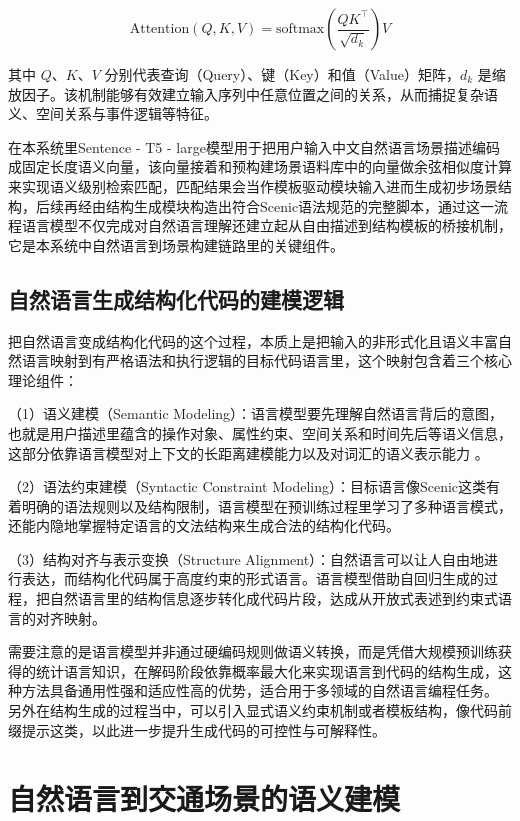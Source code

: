 \begin{equation}
	\text{Attention}(Q, K, V) = \text{softmax}\left( \frac{QK^\top}{\sqrt{d_k}} \right)V
\end{equation}

其中 $Q$、$K$、$V$ 分别代表查询（Query）、键（Key）和值（Value）矩阵，$d_k$ 是缩放因子。该机制能够有效建立输入序列中任意位置之间的关系，从而捕捉复杂语义、空间关系与事件逻辑等特征。

在本系统里Sentence - T5 - large模型用于把用户输入中文自然语言场景描述编码成固定长度语义向量，该向量接着和预构建场景语料库中的向量做余弦相似度计算来实现语义级别检索匹配，匹配结果会当作模板驱动模块输入进而生成初步场景结构，后续再经由结构生成模块构造出符合Scenic语法规范的完整脚本，通过这一流程语言模型不仅完成对自然语言理解还建立起从自由描述到结构模板的桥接机制，它是本系统中自然语言到场景构建链路里的关键组件。


\subsection{自然语言生成结构化代码的建模逻辑}

把自然语言变成结构化代码的这个过程，本质上是把输入的非形式化且语义丰富自然语言映射到有严格语法和执行逻辑的目标代码语言里，这个映射包含着三个核心理论组件：


（1）语义建模（Semantic Modeling）：语言模型要先理解自然语言背后的意图，也就是用户描述里蕴含的操作对象、属性约束、空间关系和时间先后等语义信息，这部分依靠语言模型对上下文的长距离建模能力以及对词汇的语义表示能力 。

（2）语法约束建模（Syntactic Constraint Modeling）：目标语言像Scenic这类有着明确的语法规则以及结构限制，语言模型在预训练过程里学习了多种语言模式，还能内隐地掌握特定语言的文法结构来生成合法的结构化代码。

（3）结构对齐与表示变换（Structure Alignment）：自然语言可以让人自由地进行表达，而结构化代码属于高度约束的形式语言。语言模型借助自回归生成的过程，把自然语言里的结构信息逐步转化成代码片段，达成从开放式表述到约束式语言的对齐映射。


需要注意的是语言模型并非通过硬编码规则做语义转换，而是凭借大规模预训练获得的统计语言知识，在解码阶段依靠概率最大化来实现语言到代码的结构生成，这种方法具备通用性强和适应性高的优势，适合用于多领域的自然语言编程任务。
另外在结构生成的过程当中，可以引入显式语义约束机制或者模板结构，像代码前缀提示这类，以此进一步提升生成代码的可控性与可解释性。
\section{自然语言到交通场景的语义建模}

